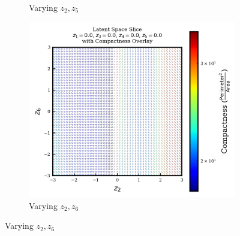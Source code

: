 \documentclass{article}
\begin{document}
\begin{figure}[H]
\begin{subfigure}{0.3\textwidth}
        \caption{Varying $z_2, z_5$}
    \end{subfigure}
    \hfill
    \begin{subfigure}{0.3\textwidth}
        \includegraphics[width=\linewidth]{figures/VAEmodels/model5/varying_z2_z6_fixed_z1=0.0_z3=0.0_z4=0.0_z5=0.0.png}
        \caption{Varying $z_2, z_6$}
    \end{subfigure}


\end{figure}
\end{document}
